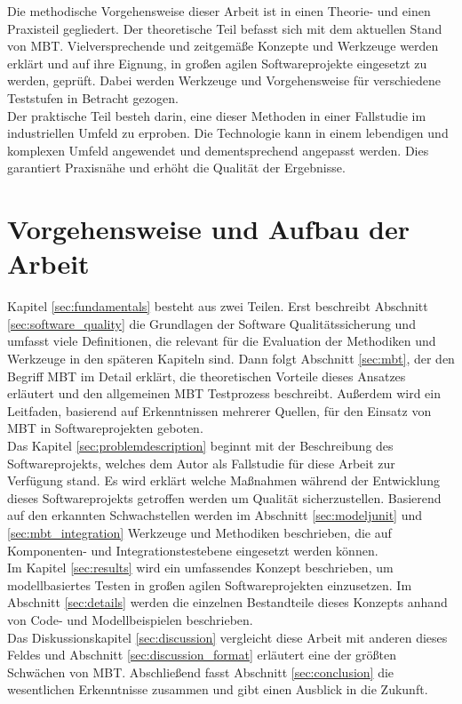 Die methodische Vorgehensweise dieser Arbeit ist in einen Theorie- und einen Praxisteil gegliedert. Der theoretische Teil befasst sich mit dem aktuellen Stand von \Gls{MBT}. Vielversprechende und zeitgemäße Konzepte und Werkzeuge werden erklärt und auf ihre Eignung, in großen agilen Softwareprojekte eingesetzt zu werden, geprüft. Dabei werden Werkzeuge und Vorgehensweise für verschiedene Teststufen in Betracht gezogen.\\
Der praktische Teil besteh darin, eine dieser Methoden in einer Fallstudie im industriellen Umfeld zu erproben. Die Technologie kann in einem lebendigen und komplexen Umfeld angewendet und dementsprechend angepasst werden. Dies garantiert Praxisnähe und erhöht die Qualität der Ergebnisse.

\section{Vorgehensweise und Aufbau der Arbeit}
Kapitel \ref{sec:fundamentals}  besteht aus zwei Teilen. Erst beschreibt Abschnitt \ref{sec:software_quality} die Grundlagen der Software Qualitätssicherung und umfasst viele Definitionen, die relevant für die Evaluation der Methodiken und Werkzeuge in den späteren Kapiteln sind. Dann folgt Abschnitt \ref{sec:mbt}, der den Begriff \Gls{MBT} im Detail erklärt, die theoretischen Vorteile dieses Ansatzes erläutert und den allgemeinen \Gls{MBT} Testprozess beschreibt. Außerdem wird ein Leitfaden, basierend auf Erkenntnissen mehrerer Quellen, für den Einsatz von \Gls{MBT} in Softwareprojekten geboten.\\

Das Kapitel \ref{sec:problemdescription}  beginnt mit der Beschreibung des Softwareprojekts, welches dem Autor als Fallstudie für diese Arbeit zur Verfügung stand. Es wird erklärt welche Maßnahmen während der Entwicklung dieses Softwareprojekts getroffen werden um Qualität sicherzustellen. Basierend auf den erkannten Schwachstellen werden im Abschnitt \ref{sec:modeljunit} und \ref{sec:mbt_integration} Werkzeuge und Methodiken beschrieben, die auf Komponenten- und Integrationstestebene eingesetzt werden können.\\

Im Kapitel \ref{sec:results} wird ein umfassendes Konzept beschrieben, um modellbasiertes Testen in großen agilen Softwareprojekten einzusetzen. Im Abschnitt \ref{sec:details} werden die einzelnen Bestandteile dieses Konzepts anhand von Code- und Modellbeispielen beschrieben.\\


Das Diskussionskapitel \ref{sec:discussion} vergleicht diese Arbeit mit anderen dieses Feldes und Abschnitt \ref{sec:discussion_format} erläutert eine der größten Schwächen von \Gls{MBT}. Abschließend fasst Abschnitt \ref{sec:conclusion} die wesentlichen Erkenntnisse zusammen und gibt einen Ausblick in die Zukunft.